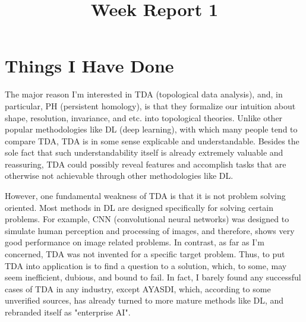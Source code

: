 \documentclass[10pt,a4paper]{article}
\title{Week Report 1}
\begin{document}
\section{Things I Have Done}
The major reason I'm interested in TDA (topological data analysis), and, in particular, PH (persistent homology), is that they formalize our intuition about shape, resolution, invariance, and etc. into topological theories. Unlike other popular methodologies like DL (deep learning), with which many people tend to compare TDA, TDA is in some sense explicable and understandable. Besides the sole fact that such understandability itself is already extremely valuable and reassuring, TDA could possibly reveal features and accomplish tasks that are otherwise not achievable through other methodologies like DL.\par

However, one fundamental weakness of TDA is that it is not problem solving oriented. Most methods in DL are designed specifically for solving certain problems. For example, CNN (convolutional neural networks) was designed to simulate human perception and processing of images, and therefore, shows very good performance on image related problems. In contrast, as far as I'm concerned, TDA was not invented for a specific target problem. Thus, to put TDA into application is to find a question to a solution, which, to some, may seem inefficient, dubious, and bound to fail. In fact, I barely found any successful cases of TDA in any industry, except AYASDI, which, according to some unverified sources, has already turned to more mature methods like DL, and rebranded itself as "enterprise AI".\par
\end{document}
